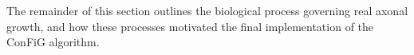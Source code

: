 The remainder of this section outlines the biological process governing real axonal growth, and how these processes motivated the final implementation of the \ac{ConFiG} algorithm.

